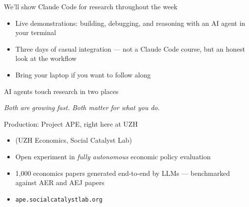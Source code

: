 \documentclass[aspectratio=169,11pt]{beamer}
\begin{document}
\begin{frame}{We'll show Claude Code for research throughout the week}
\vspace{0.5em}
\begin{itemize}
  \item Live demonstrations: building, debugging, and reasoning with an AI agent in your terminal
  \item Three days of casual integration --- not a Claude Code course, but an honest look at the workflow
  \item Bring your laptop if you want to follow along
\end{itemize}
\vspace{1em}
\end{frame}

\begin{frame}{AI agents touch research in two places}
\vspace{0.4em}
\begin{center}
\end{center}
\vspace{0.4em}
\begin{center}
\small\color{warmgray}\itshape Both are growing fast. Both matter for what you do.
\end{center}
\end{frame}

\begin{frame}{Production: Project APE, right here at UZH}
\vspace{0.4em}
\begin{itemize}
  \item {} (UZH Economics, Social Catalyst Lab)
  \item Open experiment in \textit{fully autonomous} economic policy evaluation
  \item 1,000 economics papers generated end-to-end by LLMs --- benchmarked against AER and AEJ papers
  \item \texttt{ape.socialcatalystlab.org}
\end{itemize}
\end{frame}
\end{document}
